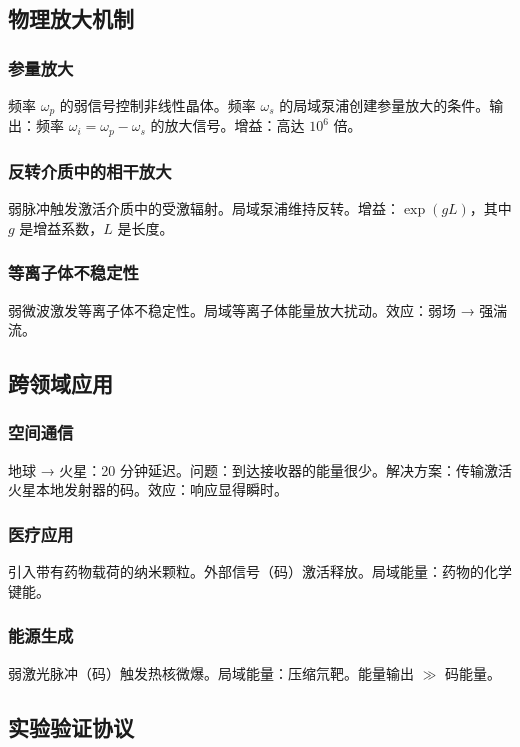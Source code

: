 \documentclass[11pt,a4paper]{article}
\begin{document}
	\subsection{物理放大机制}
	
	\subsubsection{参量放大}
	频率 $\omega_p$ 的弱信号控制非线性晶体。频率 $\omega_s$ 的局域泵浦创建参量放大的条件。输出：频率 $\omega_i = \omega_p - \omega_s$ 的放大信号。增益：高达 $10^6$ 倍。
	
	\subsubsection{反转介质中的相干放大}
	弱脉冲触发激活介质中的受激辐射。局域泵浦维持反转。增益：$\exp(gL)$，其中 $g$ 是增益系数，$L$ 是长度。
	
	\subsubsection{等离子体不稳定性}
	弱微波激发等离子体不稳定性。局域等离子体能量放大扰动。效应：弱场 → 强湍流。
	
	\subsection{跨领域应用}
	
	\subsubsection{空间通信}
	地球 → 火星：20 分钟延迟。问题：到达接收器的能量很少。解决方案：传输激活火星本地发射器的码。效应：响应显得瞬时。
	
	\subsubsection{医疗应用}
	引入带有药物载荷的纳米颗粒。外部信号（码）激活释放。局域能量：药物的化学键能。
	
	\subsubsection{能源生成}
	弱激光脉冲（码）触发热核微爆。局域能量：压缩氘靶。能量输出 $\gg$ 码能量。
	
	\subsection{实验验证协议}
	
\end{document}
